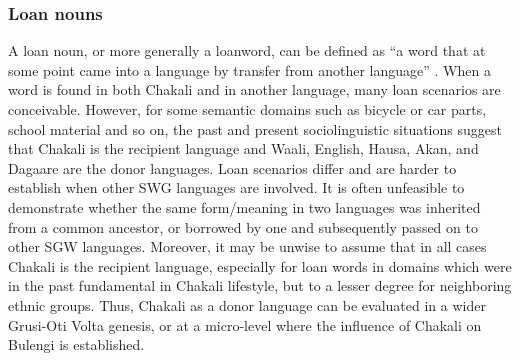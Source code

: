 


\subsubsection{Loan nouns}
\label{sec:GRM-borr-noun}


 A loan noun,  or more generally a loanword, can be defined as  ``a word that at
some point came into a language by transfer from another language''
\citep[58]{Hasp08}.  When a word is found in both Chakali and in another
language, many loan scenarios are conceivable. However,  for some semantic
domains such as   bicycle or car parts, school material and so on, the past and
present sociolinguistic situations  suggest that Chakali is
the recipient language and Waali, English, Hausa, Akan, and Dagaare are the
donor
languages.  Loan scenarios differ and are harder to establish when other SWG
languages are involved. It is often unfeasible to demonstrate whether the same
form/meaning in two languages was inherited from a common ancestor, or  
borrowed by one and subsequently passed on to other SGW languages. Moreover, it
may be unwise to assume that in all cases Chakali is  the recipient language,
especially for loan words in domains which  were in the past fundamental in
Chakali lifestyle,  but to a lesser degree for neighboring ethnic groups. 
Thus, Chakali as a donor language can be evaluated in a wider Grusi-Oti Volta
genesis, or  at a micro-level where the influence of Chakali on Bulengi is
established.

